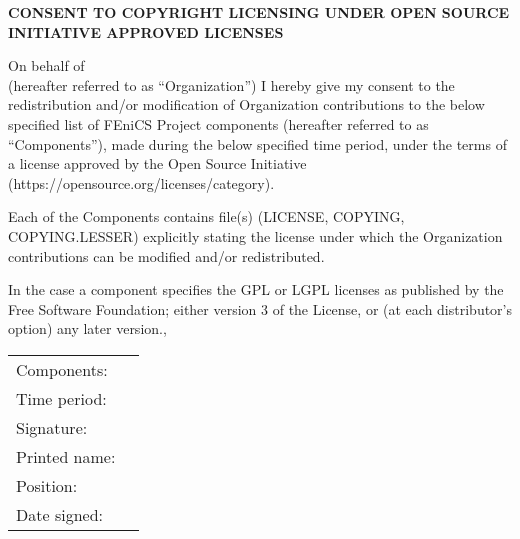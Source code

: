 \documentclass[11pt]{article}
\begin{document}
\pagestyle{empty}

\large

\begin{center}
  \textbf{CONSENT TO COPYRIGHT LICENSING UNDER OPEN SOURCE INITIATIVE APPROVED LICENSES}
\end{center}

\normalsize

\vspace{1cm}

On behalf of \underline{\hspace{12.5cm}} \\ (hereafter referred to as
``Organization'') I hereby give my consent to the redistribution and/or
modification of Organization contributions to the below specified list of
FEniCS Project components (hereafter referred to as ``Components''), made
during the below specified time period, under the terms of a license approved
by the Open Source Initiative (https://opensource.org/licenses/category).

Each of the Components contains file(s) (LICENSE, COPYING, COPYING.LESSER)
explicitly stating the license under which the Organization contributions can
be modified and/or redistributed.

In the case a component specifies the GPL or LGPL licenses as published by the
Free Software Foundation; either version 3 of the License, or (at each
distributor's option) any later version.,
\bigskip

\begin{tabular}{ll}
  Components:  & \underline{\hspace{9cm}}   \\[1.5cm]
  Time period: & \underline{\hspace{9cm}}   \\[3cm]
  Signature:     & \underline{\hspace{9cm}} \\[1.5cm]
  Printed name:  & \underline{\hspace{9cm}} \\[1.5cm]
  Position:      & \underline{\hspace{9cm}} \\[1.5cm]
  Date signed:   & \underline{\hspace{9cm}}
\end{tabular}
\end{document}
